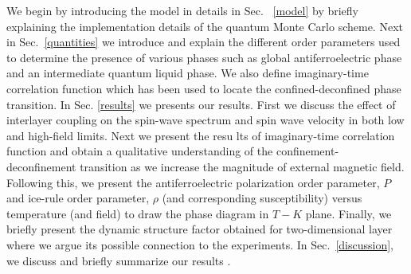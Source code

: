 \indent We begin by introducing the model in details in Sec. ~\ref{model} by briefly explaining the implementation details of the quantum Monte Carlo scheme.  Next in Sec.~\ref{quantities} we introduce and explain the different order parameters used to determine the presence of various phases such as global antiferroelectric phase and an intermediate quantum liquid phase. We also define imaginary-time correlation function which has been used to locate the  confined-deconfined phase transition.  In Sec. \ref{results}  we presents our results. First we discuss the effect of interlayer coupling on the spin-wave spectrum and spin wave velocity in both low and high-field limits. Next we present the resu lts of imaginary-time correlation function and obtain a qualitative understanding of the confinement-deconfinement transition as we increase the magnitude of external magnetic field. Following this, we present the antiferroelectric polarization order parameter, $P$ and ice-rule order parameter, $\rho$ (and corresponding susceptibility) versus temperature (and field) to draw the phase diagram in $T-K$ plane. Finally, we briefly present the dynamic structure factor obtained for two-dimensional layer where we argue its possible connection to the experiments.  In Sec.~\ref{discussion}, we discuss and briefly summarize our results .
